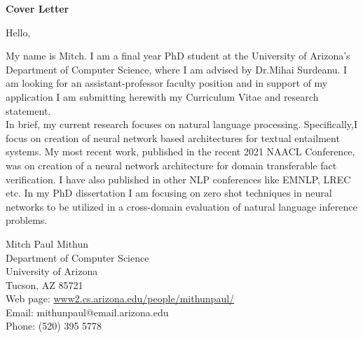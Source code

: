 \documentclass[10pt]{article}
\begin{document}

\begin{center}
{\Large \bf Cover Letter\\}

\end{center}
Hello,

\bigskip

\smallskip
My name is Mitch. I am a final year PhD student at the University of Arizona’s Department of Computer Science, where I am advised by Dr.Mihai Surdeanu.
I am looking for an assistant-professor faculty position and in support of my  application I am submitting herewith my Curriculum Vitae and research statement.\\


In brief, my current research focuses on natural language processing. Specifically,I focus on creation of neural network based architectures for textual entailment systems. My most recent work, published in the recent 2021 NAACL Conference, was on creation of a neural network architecture for domain transferable fact verification. I have also published in other NLP conferences like EMNLP, LREC etc. In my PhD dissertation I am focusing on zero shot techniques in neural networks to be utilized in a cross-domain evaluation of natural language inference problems.\\

\bigskip
\bigskip
\bigskip
\bigskip
\bigskip



Mitch Paul Mithun\\
Department of Computer Science\\
University of Arizona\\
Tucson, AZ 85721\\
Web page: \url{www2.cs.arizona.edu/people/mithunpaul/}\\ 
Email: mithunpaul@email.arizona.edu\\
Phone: (520) 395 5778	
 
\end{document}
